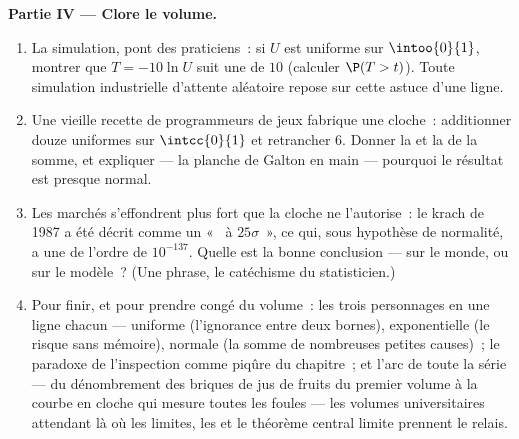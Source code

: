 \begin{problem}
\medskip
\noindent\textbf{Partie IV --- Clore le volume.}
\begin{enumerate}[resume]
  \item La simulation, pont des praticiens~: si $U$ est uniforme
        sur $\intoo{0}{1}$, montrer que $T = -10\ln U$ suit une  de  $10$ (calculer $\P(T > t)$). Toute
        simulation industrielle d'attente aléatoire repose sur cette
        astuce d'une ligne.
  \item Une vieille recette de programmeurs de jeux fabrique une
        cloche~: additionner douze uniformes  sur
        $\intcc{0}{1}$ et retrancher $6$. Donner la  et la
         de la somme, et expliquer --- la planche de Galton
        en main --- pourquoi le résultat est presque normal.
  \item Les marchés s'effondrent plus fort que la cloche ne
        l'autorise~: le krach de 1987 a été décrit comme un
        «~ à $25\sigma$~», ce qui, sous hypothèse de
        normalité, a une  de l'ordre de $10^{-137}$.
        Quelle est la bonne conclusion --- sur le monde, ou sur le
        modèle~? (Une phrase, le catéchisme du statisticien.)
  \item Pour finir, et pour prendre congé du volume~: les trois
        personnages en une ligne chacun --- uniforme (l'ignorance
        entre deux bornes), exponentielle (le risque sans mémoire),
        normale (la somme de nombreuses petites causes)~; le
        paradoxe de l'inspection comme piqûre du chapitre~; et
        l'arc de toute la série --- du dénombrement des briques de
        jus de fruits du premier volume à la courbe en cloche qui
        mesure toutes les foules --- les volumes universitaires
        attendant là où les limites, les  et le théorème
        central limite prennent le relais.
\end{enumerate}
\end{problem}
